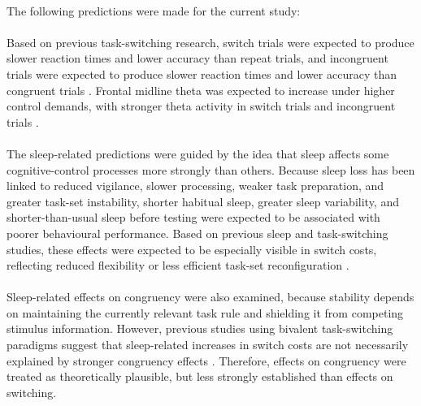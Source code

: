\documentclass[12pt,a4paper]{report}
\begin{document}
\paragraph{}
The following predictions were made for the current study:

\paragraph{}
Based on previous task-switching research, switch trials were expected to produce slower reaction times and lower accuracy than repeat trials, and incongruent trials were expected to produce slower reaction times and lower accuracy than congruent trials \parencite{rogers1995taskswitch,kiesel2010review}. Frontal midline theta was expected to increase under higher control demands, with stronger theta activity in switch trials and incongruent trials \parencite{cavanagh2014theta,cohen2013thetaconflict}.

\paragraph{}
The sleep-related predictions were guided by the idea that sleep affects some cognitive-control processes more strongly than others. Because sleep loss has been linked to reduced vigilance, slower processing, weaker task preparation, and greater task-set instability, shorter habitual sleep, greater sleep variability, and shorter-than-usual sleep before testing were expected to be associated with poorer behavioural performance. Based on previous sleep and task-switching studies, these effects were expected to be especially visible in switch costs, reflecting reduced flexibility or less efficient task-set reconfiguration \parencite{heuer2004totalsleepdeprivation,bratzke2009constantwakefulness,couyoumdjian2010switchingsleep,slama2018sleepswitching}. 

\paragraph{}
Sleep-related effects on congruency were also examined, because stability depends on maintaining the currently relevant task rule and shielding it from competing stimulus information. However, previous studies using bivalent task-switching paradigms suggest that sleep-related increases in switch costs are not necessarily explained by stronger congruency effects \parencite{heuer2004totalsleepdeprivation,bratzke2009constantwakefulness}. Therefore, effects on congruency were treated as theoretically plausible, but less strongly established than effects on switching.
\end{document}
